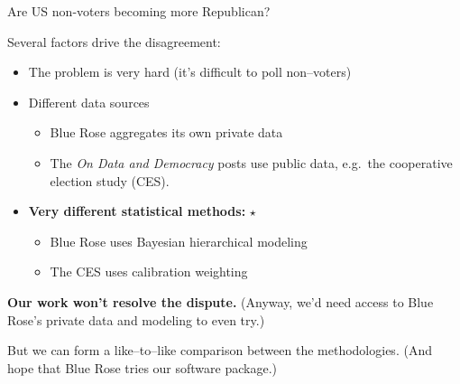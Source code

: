 
\begin{frame}{Are US non-voters becoming more Republican?}



Several factors drive the disagreement:
%
\begin{itemize}
\item The problem is very hard (it's difficult to poll non--voters)
\item Different data sources
%
\begin{itemize}
    \item Blue Rose aggregates its own private data
    \item The \emph{On Data and Democracy} posts use public data, e.g.~the
        cooperative election study (CES).
\end{itemize}
%
\item \textbf{Very different statistical methods:} $\star$
\begin{itemize}
    \item Blue Rose uses Bayesian hierarchical modeling
    \item The CES uses calibration weighting
\end{itemize}
%
\end{itemize}

\textbf{Our work won't resolve the dispute.}  (Anyway, we'd need access to Blue Rose's private
data and modeling to even try.)

But we can form a like--to--like comparison between the methodologies.  (And hope that
Blue Rose tries our software package.)

\end{frame}




